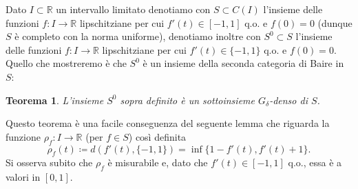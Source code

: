\documentclass[a4paper,11pt]{book}
\theoremstyle{plain}
\newtheorem{teo}{Teorema}[chapter]
\theoremstyle{definition}
\theoremstyle{remark}
\newcommand{\R}{\mathbb{R}}
\begin{document}


Dato $I\subset \R$ un intervallo limitato denotiamo con $S\subset C(I)$ l'insieme delle funzioni $f:I\to \R$ lipschitziane per cui $f'(t)\in [-1,1]$ q.o. e $f(0)=0$ (dunque $S$ è completo con la norma uniforme), denotiamo inoltre con $S^0\subset S$ l'insieme delle funzioni $f:I\to\R$ lipschitziane per cui $f'(t)\in\{-1,1\}$ q.o. e $f(0)=0$. Quello che mostreremo è che $S^0$ è un insieme della seconda categoria di Baire in $S$:
\begin{teo}\label{teo:8}
	L'insieme $S^0$ sopra definito è un sottoinsieme $G_{\delta}$-denso di $S$.
\end{teo}

Questo teorema è una facile conseguenza del seguente lemma che riguarda la funzione $\rho_{f}:I\to\R$ (per $f\in S$) così definita
\[
	\rho_f(t)\coloneqq d(f'(t),\{-1,1\}) = \inf\{1-f'(t),f'(t)+1\}.
\]
Si osserva subito che $\rho_f$ è misurabile e, dato che $f'(t)\in [-1,1]$ q.o., essa è a valori in $[0,1]$.
\end{document}
